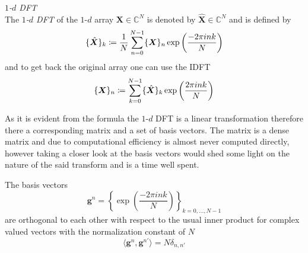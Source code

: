 \begin{Def}\label{def:1ddft}
    \emph{$1$-$d$ \ac{DFT}}\\
    The \emph{$1$-$d$ \ac{DFT}}  of the $1$-$d$ array $\boldsymbol{X} \in \mathbb{C}^{N}$ is denoted by 
    $\hat {\boldsymbol{X}} \in \mathbb{C}^{N}$ and is defined by
    \begin{equation}\label{eq:1ddft}
        \{\hat {\boldsymbol{X}}\}_{k} \coloneqq \frac{1}{N}\sum_{n=0}^{N-1} \{{\boldsymbol{X}}\}_{n}\exp\left({\frac{-2\pi ink}{N}}\right)\index{\ac{FT}!$1$-$d$ \ac{DFT}}
    \end{equation}
    and to get back the original array one can use the \ac{IDFT} 
    \begin{equation}\label{eq:1didft}
        \{{\boldsymbol{X}}\}_{n} \coloneqq \sum_{k=0}^{N-1}\{\hat {\boldsymbol{X}}\}_{k}\exp\left({\frac{2\pi ink}{N}}\right)\index{\ac{FT}!$1$-$d$ \ac{IDFT}}
    \end{equation}    
\end{Def}

As it is evident from the formula the $1$-$d$ \ac{DFT} is a linear transformation therefore there a corresponding matrix 
and a set of basis vectors. The matrix is a dense matrix\cite{Frazier1999}\cite{Cormen2022} and due to computational 
efficiency\cite{Frazier1999}\cite{Cormen2022} is almost never computed directly, however taking a closer look at the 
basis vectors would shed some light on the nature of the said transform and is a time well spent.

\begin{Prop}\label{Prop:1ddftbasisvectors}
    The basis vectors
    \begin{equation}\label{eq:1ddftbasisvectors}
        \boldsymbol{g}^n = \left\{\exp\left({\frac{-2\pi ink}{N}}\right)\right\}_{k=0,\ldots,N-1}
    \end{equation}
    are orthogonal to each other with respect to the usual inner product for complex valued vectors 
    with the normalization constant of $N$
    \begin{equation}
        \langle\boldsymbol{g}^n,\boldsymbol{g}^{n'}\rangle= N \delta_{n,n'}
    \end{equation}
\end{Prop}

